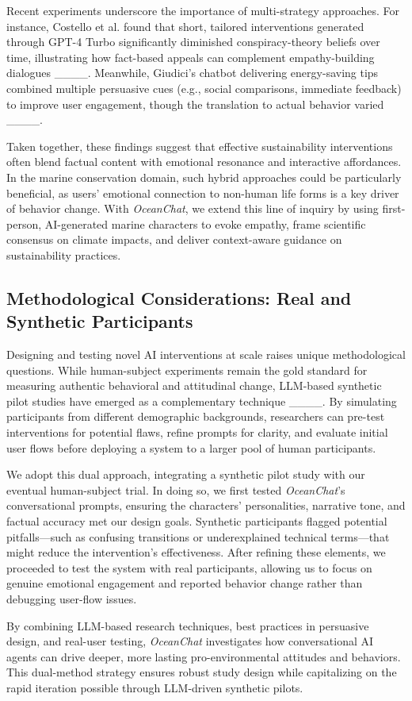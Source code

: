 Recent experiments underscore the importance of multi-strategy approaches. For instance, Costello et al. found that short, tailored interventions generated through GPT-4 Turbo significantly diminished conspiracy-theory beliefs over time, illustrating how fact-based appeals can complement empathy-building dialogues ____. Meanwhile, Giudici’s chatbot delivering energy-saving tips combined multiple persuasive cues (e.g., social comparisons, immediate feedback) to improve user engagement, though the translation to actual behavior varied ____.

Taken together, these findings suggest that effective sustainability interventions often blend factual content with emotional resonance and interactive affordances. In the marine conservation domain, such hybrid approaches could be particularly beneficial, as users’ emotional connection to non-human life forms is a key driver of behavior change. With \textit{OceanChat}, we extend this line of inquiry by using first-person, AI-generated marine characters to evoke empathy, frame scientific consensus on climate impacts, and deliver context-aware guidance on sustainability practices.

\subsection{Methodological Considerations: Real and Synthetic Participants}
Designing and testing novel AI interventions at scale raises unique methodological questions. While human-subject experiments remain the gold standard for measuring authentic behavioral and attitudinal change, LLM-based synthetic pilot studies have emerged as a complementary technique ____. By simulating participants from different demographic backgrounds, researchers can pre-test interventions for potential flaws, refine prompts for clarity, and evaluate initial user flows before deploying a system to a larger pool of human participants.

We adopt this dual approach, integrating a synthetic pilot study with our eventual human-subject trial. In doing so, we first tested \textit{OceanChat}’s conversational prompts, ensuring the characters’ personalities, narrative tone, and factual accuracy met our design goals. Synthetic participants flagged potential pitfalls—such as confusing transitions or underexplained technical terms—that might reduce the intervention’s effectiveness. After refining these elements, we proceeded to test the system with real participants, allowing us to focus on genuine emotional engagement and reported behavior change rather than debugging user-flow issues.

By combining LLM-based research techniques, best practices in persuasive design, and real-user testing, \textit{OceanChat} investigates how conversational AI agents can drive deeper, more lasting pro-environmental attitudes and behaviors. This dual-method strategy ensures robust study design while capitalizing on the rapid iteration possible through LLM-driven synthetic pilots.